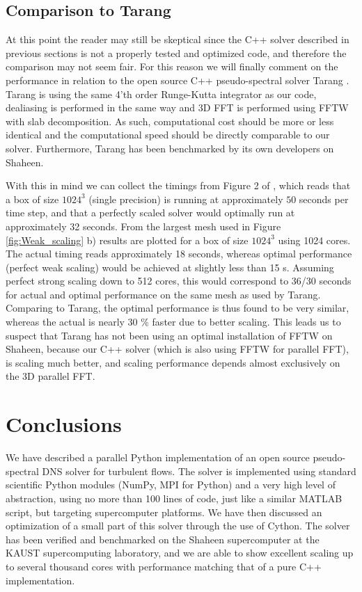 \documentclass[final,3p,times,twocolumn]{elsarticle}
\begin{document}
\subsection{Comparison to Tarang}
At this point the reader may still be skeptical since the C++ solver described 
in previous sections  
is not a properly tested and optimized code, and therefore the comparison may  
not seem fair. For this reason we will finally comment on the performance in 
relation to 
the open source C++ pseudo-spectral solver Tarang \cite{tarang}. 
Tarang is 
using the same 4'th order Runge-Kutta integrator as our code, dealiasing is 
performed in the same way and 3D FFT is performed using FFTW with slab 
decomposition. As such, computational cost should be more or less identical and 
the computational speed should be directly comparable to our solver. 
Furthermore, Tarang  has been benchmarked by its own developers on Shaheen. 

With this 
in mind we can collect the timings from Figure 2 of \cite{tarang}, which reads 
that a box of size $1024^3$ (single precision) is running at approximately $50$ 
seconds per time step, and that a perfectly scaled solver would optimally run 
at approximately 32 seconds. From the 
largest mesh used in Figure \ref{fig:Weak_scaling} b) results are plotted for a 
box of size $1024^3$ using 1024 cores. The actual timing reads approximately 18 
seconds, whereas optimal performance 
(perfect weak scaling) would be achieved at slightly less than 15 s. Assuming 
perfect strong 
scaling down to 512 cores, this would correspond to 36/30 seconds for actual 
and optimal performance on the same mesh as used by Tarang. Comparing to 
Tarang, the optimal performance is thus found to be very similar, whereas
the actual is nearly 30 \% faster due to better scaling. This leads us to 
suspect that Tarang has not been using an optimal installation of FFTW on 
Shaheen, because our C++ solver (which is also using FFTW for parallel FFT), is 
scaling much better, and scaling performance depends almost exclusively on the 
3D parallel FFT.

\section{Conclusions}

We have described a parallel Python implementation of an open source 
pseudo-spectral DNS solver for turbulent flows. The solver is implemented using 
standard scientific Python modules (NumPy, MPI for Python) and a very high 
level of 
abstraction, using no more than 100 lines of code, just like a similar MATLAB 
script, but targeting supercomputer platforms. We have then discussed an 
optimization of a small part of this solver through the use of Cython. The 
solver has been verified and benchmarked on the Shaheen supercomputer at the 
KAUST supercomputing laboratory, and we are able to show excellent scaling up 
to several thousand cores with performance matching that of a pure C++ 
implementation.
\end{document}
